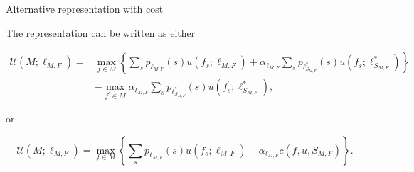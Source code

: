\documentclass[usenames,dvipsnames,aspectratio=169,11pt, envcountsect, handout]{beamer}
\begin{document}
\begin{frame}{Alternative representation with cost}\label{cost}

	The representation can be written as either

	\[
		\begin{aligned}
			\mathcal{U} \left(M ; \ell_{M, F} \right) = & \max _{f \in M}\left\{\sum_{s} p_{\ell_{M, F}} \left( s \right) u \left( f_{s} ; \ell_{M, F} \right) +\alpha _{\ell_{M, F}} \sum_{s} p_{\ell^{*}_{S_{M, F}}} \left( s \right) u \left( f_{s} ; \ell^{*}_{S_{M, F}} \right) \right\} \\
			                                            & -\max _{f^{\prime} \in M} \alpha _{\ell_{M, F}} \sum_{s} p_{\ell^{*}_{S_{M, F}}} \left( s \right) u\left(f^{\prime}_{s} ; \ell^{*}_{S_{M, F}} \right) ,
		\end{aligned}
	\]

	or

	\[
		\mathcal{U} \left(M ; \ell_{M, F} \right) = \max _{f \in M}\left\{\sum_{s} p_{\ell_{M, F}} \left( s \right) u \left( f_{s} ; \ell_{M, F} \right) - \alpha_{\ell_{M, F}} c \left( f, u, S_{M,F} \right) \right\} .
	\]

	\begin{flushright}
		\hyperlink{fullmodel}{}
	\end{flushright}

\end{frame}
\end{document}
